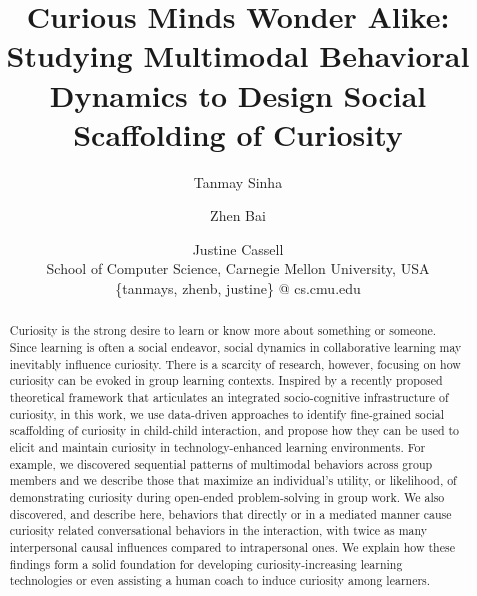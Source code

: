 \documentclass{llncs}
\begin{document}
\title{Curious Minds Wonder Alike: Studying Multimodal Behavioral Dynamics to Design Social Scaffolding of Curiosity}
\author{Tanmay Sinha \and Zhen Bai \and Justine Cassell \\School of Computer Science, Carnegie Mellon University, USA \\ \{tanmays, zhenb, justine\} @ cs.cmu.edu}
\institute{}
\maketitle
\vspace{-0.5cm}
\begin{abstract}
Curiosity is the strong desire to learn or know more about something or someone. Since learning is often a social endeavor, social dynamics in collaborative learning may inevitably influence curiosity. There is a scarcity of research, however, focusing on how curiosity can be evoked in group learning contexts. Inspired by a recently proposed theoretical framework \cite{sinhaectel1} that articulates an integrated socio-cognitive infrastructure of curiosity, in this work, we use data-driven approaches to identify fine-grained social scaffolding of curiosity in child-child interaction, and propose how they can be used to elicit and maintain curiosity in technology-enhanced learning environments. For example, we discovered sequential patterns of multimodal behaviors across group members and we describe those that maximize an individual's utility, or likelihood, of demonstrating curiosity during open-ended problem-solving in group work. We also discovered, and describe here, behaviors that directly or in a mediated manner cause curiosity related conversational behaviors in the interaction, with twice as many interpersonal causal influences compared to intrapersonal ones. We explain how these findings form a solid foundation for developing curiosity-increasing learning technologies or even assisting a human coach to induce curiosity among learners. 
\end{abstract}
\vspace{-0.8cm}
\end{document}
